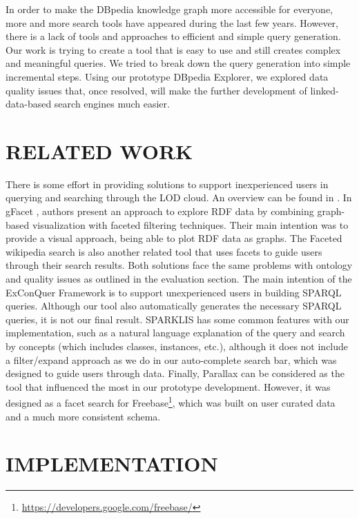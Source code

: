 \documentclass{sig-alternate}
\begin{document}
In order to make the DBpedia knowledge graph more accessible for everyone, more and more search tools have appeared during the last few years. However, there is a lack of tools and approaches to eﬃcient and simple query generation. Our work is trying to create a tool that is easy to use and still creates complex and meaningful queries. We tried to break down the query generation into simple incremental steps. Using our prototype DBpedia Explorer, we explored data quality issues that, once resolved, will make the further development of linked-data-based search engines much easier.

\section{RELATED WORK}

There is some eﬀort in providing solutions to support inexperienced users in querying and searching through the LOD cloud. An overview can be found in  \cite{_Ref490639265} \cite{_Ref490639271}. In gFacet  \cite{_Ref490639311}, authors present an approach to explore RDF data by combining graph-based visualization with faceted ﬁltering techniques. Their main intention was to provide a visual approach, being able to plot RDF data as graphs. The Faceted wikipedia search  \cite{_Ref490639358} is also another related tool that uses facets to guide users through their search results. Both solutions face the same problems with ontology and quality issues as outlined in the evaluation section. The main intention of the ExConQuer Framework  \cite{_Ref490639203} is to support unexperienced users in building SPARQL queries. Although our tool also automatically generates the necessary SPARQL queries, it is not our ﬁnal result. SPARKLIS  \cite{_Ref490639375} has some common features with our implementation, such as a natural language explanation of the query and search by concepts (which includes classes, instances, etc.), although it does not include a ﬁlter/expand approach as we do in our auto-complete search bar, which was designed to guide users through data. Finally, Parallax  \cite{_Ref490639388} can be considered as the tool that inﬂuenced the most in our prototype development. However, it was designed as a facet search for Freebase\footnote{\url{https://developers.google.com/freebase/}}, which was built on user curated data and a much more consistent schema.

\section{IMPLEMENTATION}
\end{document}
